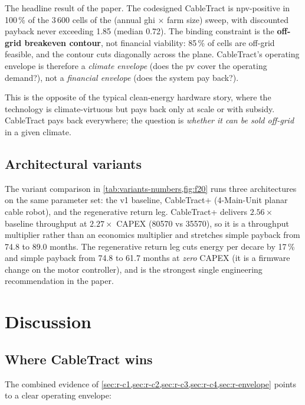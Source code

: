 \documentclass[11pt,a4paper]{article}
\begin{document}
The headline result of the paper. The codesigned CableTract is \gls{npv}-positive in 100\,\% of the 3\,600 cells of the (annual \gls{ghi} $\times$ farm size) sweep, with discounted payback never exceeding \SI{1.85}{\year} (median \SI{0.72}{\year}). The binding constraint is the \textbf{off-grid breakeven contour}, not financial viability: 85\,\% of cells are off-grid feasible, and the contour cuts diagonally across the plane. CableTract's operating envelope is therefore a \emph{climate envelope} (does the \gls{pv} cover the operating demand?), not a \emph{financial envelope} (does the system pay back?).

This is the opposite of the typical clean-energy hardware story, where the technology is climate-virtuous but pays back only at scale or with subsidy. CableTract pays back everywhere; the question is \emph{whether it can be sold off-grid} in a given climate.

\subsection{Architectural variants}\label{sec:r-pareto}

The variant comparison in \cref{tab:variants-numbers,fig:f20} runs three architectures on the same parameter set: the v1 baseline, CableTract+ (4-Main-Unit planar cable robot), and the regenerative return leg. CableTract+ delivers $2.56\times$ baseline throughput at $2.27\times$ CAPEX (\SI{80570}{\EUR} vs \SI{35570}{\EUR}), so it is a throughput multiplier rather than an economics multiplier and stretches simple payback from 74.8 to 89.0 months. The regenerative return leg cuts energy per decare by 17\,\% and simple payback from 74.8 to 61.7 months at \emph{zero} CAPEX (it is a firmware change on the motor controller), and is the strongest single engineering recommendation in the paper.

\section{Discussion}\label{sec:discussion}

\subsection{Where CableTract wins}\label{sec:wins}

The combined evidence of \cref{sec:r-c1,sec:r-c2,sec:r-c3,sec:r-c4,sec:r-envelope} points to a clear operating envelope:
\end{document}
